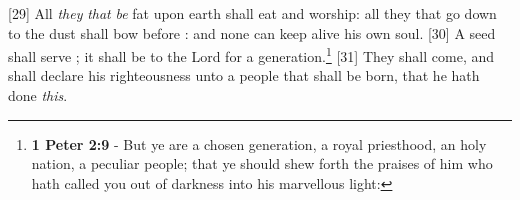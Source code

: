 [29] \textcolor[cmyk]{0.99998,1,0,0}{All \emph{they} \emph{that} \emph{be} fat upon earth shall eat and worship: all they that go down to the dust shall bow before : and none can keep alive his own soul.}
[30] \textcolor[cmyk]{0.99998,1,0,0}{A seed shall serve ; it shall be  to the Lord for a generation.}\footnote{\textbf{1 Peter 2:9} - But ye are a chosen generation, a royal priesthood, an holy nation, a peculiar people; that ye should shew forth the praises of him who hath called you out of darkness into his marvellous light:}
[31] \textcolor[cmyk]{0.99998,1,0,0}{They shall come, and shall declare his righteousness unto a people that shall be born, that he hath done \emph{this}.}


